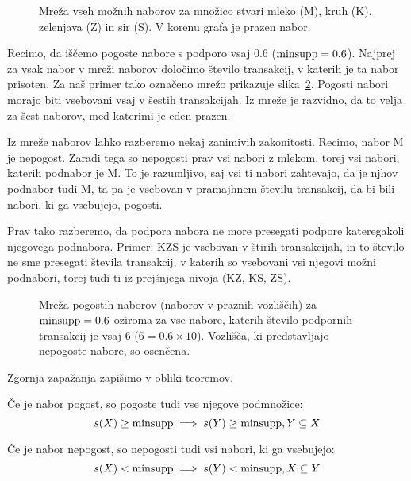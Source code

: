 \begin{figure}[htbp]
\caption{Mreža vseh možnih naborov za množico stvari mleko (M), kruh (K), zelenjava (Z) in sir (S). V korenu grafa je prazen nabor.}
\label{f:mreza-naborov}
\end{figure}

Recimo, da iščemo pogoste nabore s podporo vsaj 0.6 (${\rm minsupp}=0.6$). Najprej za vsak nabor v mreži naborov določimo število transakcij, v katerih je ta nabor prisoten. Za naš primer tako označeno mrežo prikazuje slika~\ref{f:mreza-pogostih-naborov}. Pogosti nabori morajo biti vsebovani vsaj v šestih transakcijah. Iz mreže je razvidno, da to velja za šest naborov, med katerimi je eden prazen.

Iz mreže naborov lahko razberemo nekaj zanimivih zakonitosti. Recimo, nabor M je nepogost. Zaradi tega so nepogosti prav vsi nabori z mlekom, torej vsi nabori, katerih podnabor je M. To je razumljivo, saj vsi ti nabori zahtevajo, da je njhov podnabor tudi M, ta pa je vsebovan v pramajhnem številu transakcij, da bi bili nabori, ki ga vsebujejo, pogosti.

Prav tako razberemo, da podpora nabora ne more presegati podpore kateregakoli njegovega podnabora. Primer: KZS je vsebovan v štirih transakcijah, in to število ne sme presegati števila transakcij, v katerih so vsebovani vsi njegovi možni podnabori, torej tudi ti iz prejšnjega nivoja (KZ, KS, ZS).

\begin{figure}[htbp]
\caption{Mreža pogostih naborov (naborov v praznih vozliščih) za ${\rm minsupp}=0.6$ oziroma za vse nabore, katerih število podpornih transakcij je vsaj 6 ($6=0.6\times 10$). Vozlišča, ki predstavljajo nepogoste nabore, so osenčena.}
\label{f:mreza-pogostih-naborov}
\end{figure}

Zgornja zapažanja zapišimo v obliki teoremov.

\begin{teorem}
  Če je nabor pogost, so pogoste tudi vse njegove podmnožice:
  $$s(X)\geq{\rm minsupp}\implies s(Y)\geq{\rm minsupp}, Y\subseteq X$$
\end{teorem}

\begin{teorem}
  Če je nabor nepogost, so nepogosti tudi vsi nabori, ki ga vsebujejo:
  $$s(X)<{\rm minsupp}\implies s(Y)<{\rm minsupp}, X\subseteq Y$$
\end{teorem}

